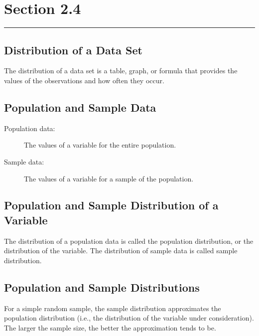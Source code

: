 \documentclass[12pt]{article}
\begin{document}
    \section*{Section 2.4}
    \noindent\rule{\textwidth}{0.4pt}
        \subsection*{Distribution of a Data Set}
            The distribution of a data set is a table, graph, or formula that provides the
            values of the observations and how often they occur.
        \subsection*{Population and Sample Data}
            \begin{description}
                \item[Population data:] The values of a variable for the entire population.
                \item[Sample data:] The values of a variable for a sample of the population. 
            \end{description}
        \subsection*{Population and Sample Distribution of a Variable}
            The distribution of a population data is called the population distribution, or
            the distribution of the variable. The distribution of sample data is called
            sample distribution.
        \subsection*{Population and Sample Distributions}
            For a simple random sample, the sample distribution approximates the population
            distribution (i.e., the distribution of the variable under consideration). The
            larger the sample size, the better the approximation tends to be.
    
\end{document}
